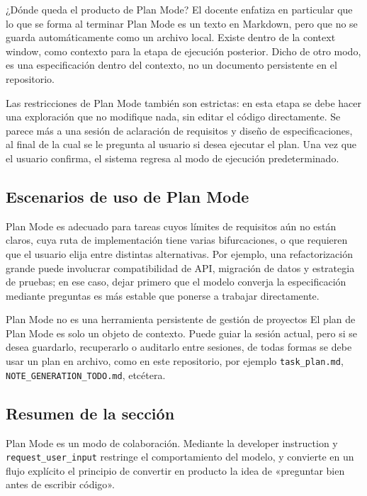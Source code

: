 \documentclass[a4paper]{article}
\begin{document}
\begin{knowledgebox}{¿Dónde queda el producto de Plan Mode?}
El docente enfatiza en particular que lo que se forma al terminar Plan Mode es un texto en Markdown, pero que no se guarda automáticamente como un archivo local. Existe dentro de la context window, como contexto para la etapa de ejecución posterior. Dicho de otro modo, es una especificación dentro del contexto, no un documento persistente en el repositorio.
\end{knowledgebox}

Las restricciones de Plan Mode también son estrictas: en esta etapa se debe hacer una exploración que no modifique nada, sin editar el código directamente. Se parece más a una sesión de aclaración de requisitos y diseño de especificaciones, al final de la cual se le pregunta al usuario si desea ejecutar el plan. Una vez que el usuario confirma, el sistema regresa al modo de ejecución predeterminado.

\subsection{Escenarios de uso de Plan Mode}

Plan Mode es adecuado para tareas cuyos límites de requisitos aún no están claros, cuya ruta de implementación tiene varias bifurcaciones, o que requieren que el usuario elija entre distintas alternativas. Por ejemplo, una refactorización grande puede involucrar compatibilidad de API, migración de datos y estrategia de pruebas; en ese caso, dejar primero que el modelo converja la especificación mediante preguntas es más estable que ponerse a trabajar directamente.

\begin{warningbox}{Plan Mode no es una herramienta persistente de gestión de proyectos}
El plan de Plan Mode es solo un objeto de contexto. Puede guiar la sesión actual, pero si se desea guardarlo, recuperarlo o auditarlo entre sesiones, de todas formas se debe usar un plan en archivo, como en este repositorio, por ejemplo \texttt{task\_plan.md}, \texttt{NOTE\_GENERATION\_TODO.md}, etcétera.
\end{warningbox}

\subsection{Resumen de la sección}

Plan Mode es un modo de colaboración. Mediante la developer instruction y \texttt{request\_user\_input} restringe el comportamiento del modelo, y convierte en un flujo explícito el principio de convertir en producto la idea de «preguntar bien antes de escribir código».
\end{document}
